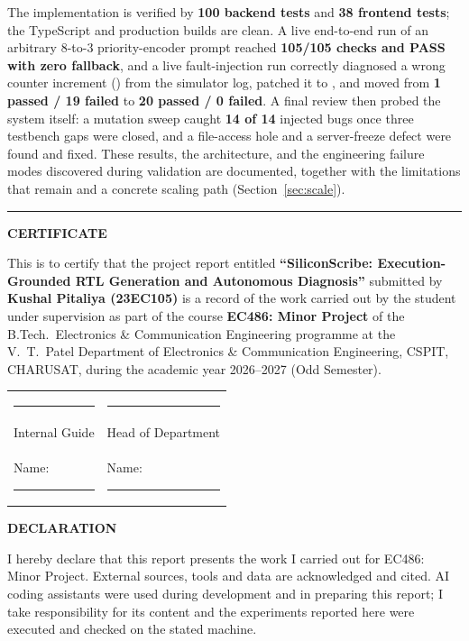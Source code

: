 \documentclass[11pt,a4paper]{article}
\newcommand{\code}[1]{\texttt{\detokenize{#1}}}
\newcommand{\abstractrule}{\noindent\rule{\textwidth}{0.8pt}\par\vspace{3pt}}
\begin{document}
The implementation is verified by \textbf{100 backend tests} and \textbf{38 frontend
tests}; the TypeScript and production builds are clean. A live end-to-end run of an
arbitrary 8-to-3 priority-encoder prompt reached \textbf{105/105 checks and PASS with
zero fallback}, and a live fault-injection run correctly diagnosed a wrong counter
increment (\code{2'd2}) from the simulator log, patched it to \code{1'b1}, and moved
from \textbf{1 passed / 19 failed} to \textbf{20 passed / 0 failed}. A final review then probed the system itself: a mutation sweep caught \textbf{14 of 14} injected bugs once three testbench gaps were closed, and a file-access hole and a server-freeze defect were found and fixed. These results,
the architecture, and the engineering failure modes discovered during validation are
documented, together with the limitations that remain and a concrete scaling path (Section~\ref{sec:scale}).

\abstractrule
\clearpage
\begin{center}{\large\bfseries CERTIFICATE}\end{center}
\noindent This is to certify that the project report entitled \textbf{``SiliconScribe: Execution-Grounded RTL Generation and Autonomous Diagnosis''} submitted by \textbf{Kushal Pitaliya (23EC105)} is a record of the work carried out by the student under supervision as part of the course \textbf{EC486: Minor Project} of the B.Tech.\ Electronics \& Communication Engineering programme at the V.\ T.\ Patel Department of Electronics \& Communication Engineering, CSPIT, CHARUSAT, during the academic year 2026--2027 (Odd Semester).

\vspace{1.4cm}
\noindent\begin{tabular}{@{}p{7.6cm}p{7.6cm}@{}}
\rule{5.5cm}{0.4pt} & \rule{5.5cm}{0.4pt}\\
Internal Guide & Head of Department\\
Name: \rule{4.4cm}{0.4pt} & Name: \rule{4.4cm}{0.4pt}\\
\end{tabular}

\vspace{1cm}
\begin{center}{\large\bfseries DECLARATION}\end{center}
\noindent I hereby declare that this report presents the work I carried out for EC486: Minor Project. External sources, tools and data are acknowledged and cited. AI coding assistants were used during development and in preparing this report; I take responsibility for its content and the experiments reported here were executed and checked on the stated machine.
\end{document}
